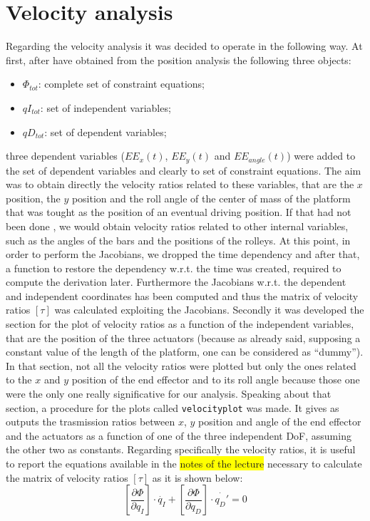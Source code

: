 \documentclass[10.5pt, twocolumn]{article}
\newcommand{\Virgolette}[1]{``#1''}
\begin{document}
{\section{Velocity analysis}
Regarding the velocity analysis it was decided to operate in the following way.
At first, after have obtained from the position analysis the following three objects:
  \begin{itemize}
    \item \( \Phi_{tot}\): complete set of constraint equations;
    \item \( qI_{tot}\): set of independent variables;
    \item \( qD_{tot}\): set of dependent variables;
  \end{itemize}
three dependent variables (\( EE_{x}(t) \), \( EE_{y}(t) \) and \(EE_{angle}(t)\)) were added to the set of dependent variables and clearly to set of constraint equations. The aim was to obtain directly the velocity ratios related to these variables, that are the \( x \) position, the \( y \) position and the roll angle of the center of mass of the platform that was tought as the position of an eventual driving position.
If that had not been done , we would obtain velocity ratios related  to other internal variables, such as the angles of the bars and the positions of the rolleys.
At this point, in order to perform the Jacobians, we dropped the time dependency and after that, a function to restore the dependency w.r.t. the time was created, required to compute the derivation later.
Furthermore the Jacobians w.r.t. the dependent and independent coordinates has been computed and thus the matrix of velocity ratios \([ \tau ]\) was calculated exploiting the Jacobians.
Secondly it was developed the section for the plot of velocity ratios as a function of the independent variables, that are the position of the three actuators (because as already said, supposing a constant value of the length of the platform, one can be considered as \Virgolette{dummy}). In that section, not all the velocity ratios were plotted but only the ones related to the \( x \) and \( y \) position of the end effector and to its roll angle because those one were the only one really significative for our analysis.
Speaking about that section, a procedure for the plots called \texttt{velocity\textunderscore plot} was made.
It gives as outputs the trasmission ratios between \( x \), \( y \) position and angle of the end effector and the actuators as a function of one of the three independent DoF, assuming the other two as constants.
Regarding specifically the velocity ratios, it is useful to report the equations available in the \colorbox{yellow}{notes of the lecture} necessary to calculate the matrix of velocity ratios \([ \tau ]\) as it is shown below:
  \begin{equation}
    \left[\frac{\partial \Phi }{\partial q_I}\right] \cdot \dot{q_I} + \left[\frac{\partial \Phi }{\partial q_D}\right] \cdot \dot{q_D'} = 0
  \end{equation}

}
\end{document}
